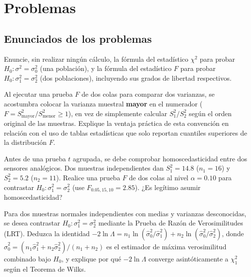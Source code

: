 \section*{Problemas}

\subsection*{Enunciados de los problemas}

\begin{problema}
	\label{prob:246a30e}
	Enuncie, sin realizar ningún cálculo, la fórmula del estadístico $\chi^2$ para probar $H_0:\sigma^2=\sigma_0^2$ (una población), y la fórmula del estadístico $F$ para probar $H_0:\sigma_1^2=\sigma_2^2$ (dos poblaciones), incluyendo sus grados de libertad respectivos.
\end{problema}

\begin{problema}
	\label{prob:0a7aead}
	Al ejecutar una prueba $F$ de dos colas para comparar dos varianzas, se acostumbra colocar la varianza muestral \textbf{mayor} en el numerador ($F=S_{\text{mayor}}^2/S_{\text{menor}}^2 \ge 1$), en vez de simplemente calcular $S_1^2/S_2^2$ según el orden original de las muestras. Explique la ventaja práctica de esta convención en relación con el uso de tablas estadísticas que solo reportan cuantiles superiores de la distribución $F$.
\end{problema}

\begin{problema}
	\label{prob:682c2b2}
	Antes de una prueba $t$ agrupada, se debe comprobar homoscedasticidad entre dos sensores analógicos. Dos muestras independientes dan $S_1^2=14.8$ ($n_1=16$) y $S_2^2=5.2$ ($n_2=11$). Realice una prueba $F$ de dos colas al nivel $\alpha=0.10$ para contrastar $H_0:\sigma_1^2=\sigma_2^2$ (use $F_{0.05,15,10}=2.85$). ¿Es legítimo asumir homoscedasticidad?
\end{problema}

\begin{problema}
	\label{prob:120019a}
	Para dos muestras normales independientes con medias y varianzas desconocidas, se desea contrastar $H_0:\sigma_1^2=\sigma_2^2$ mediante la Prueba de Razón de Verosimilitudes (LRT). Deduzca la identidad $-2\ln\Lambda = n_1\ln(\hat\sigma_0^2/\hat\sigma_1^2)+n_2\ln(\hat\sigma_0^2/\hat\sigma_2^2)$, donde $\hat\sigma_0^2=(n_1\hat\sigma_1^2+n_2\hat\sigma_2^2)/(n_1+n_2)$ es el estimador de máxima verosimilitud combinado bajo $H_0$, y explique por qué $-2\ln\Lambda$ converge asintóticamente a $\chi^2_1$ según el Teorema de Wilks.
\end{problema}

